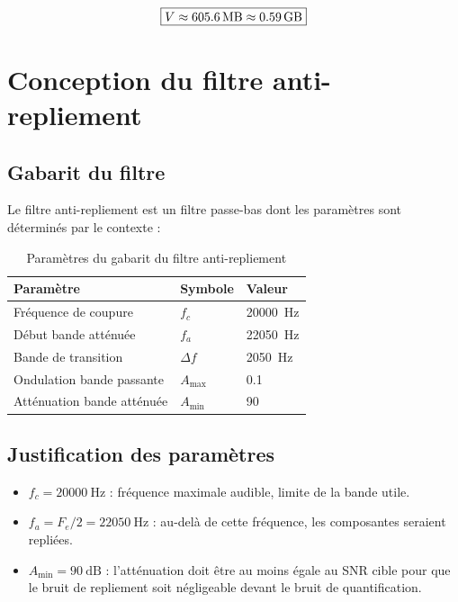 \documentclass[12pt, a4paper, french]{article}
\newcommand{\Fe}{F_e}
\newcommand{\dB}{\text{dB}}
\begin{document}
\begin{equation}
    \boxed{V \approx \SI{605.6}{\mega\byte} \approx \SI{0.59}{\giga\byte}}
\end{equation}

\section{Conception du filtre anti-repliement}
\label{sec:filtre}

\subsection{Gabarit du filtre}

Le filtre anti-repliement est un filtre passe-bas dont les paramètres sont déterminés par le contexte :

\begin{table}[H]
    \centering
    \caption{Paramètres du gabarit du filtre anti-repliement}
    \label{tab:gabarit}
    \begin{tabular}{lll}
        \toprule
        \textbf{Paramètre} & \textbf{Symbole} & \textbf{Valeur} \\
        \midrule
        Fréquence de coupure       & $f_c$        & \SI{20000}{\hertz} \\
        Début bande atténuée       & $f_a$        & \SI{22050}{\hertz} \\
        Bande de transition        & $\Delta f$   & \SI{2050}{\hertz} \\
        Ondulation bande passante  & $A_{\max}$   & \SI{0.1}{\dB} \\
        Atténuation bande atténuée & $A_{\min}$   & \SI{90}{\dB} \\
        \bottomrule
    \end{tabular}
\end{table}

\subsection{Justification des paramètres}

\begin{itemize}
    \item $f_c = \SI{20000}{\hertz}$ : fréquence maximale audible, limite de la bande utile.
    \item $f_a = \Fe/2 = \SI{22050}{\hertz}$ : au-delà de cette fréquence, les composantes seraient repliées.
    \item $A_{\min} = \SI{90}{\dB}$ : l'atténuation doit être au moins égale au SNR cible pour que le bruit de repliement soit négligeable devant le bruit de quantification.
\end{itemize}
\end{document}
